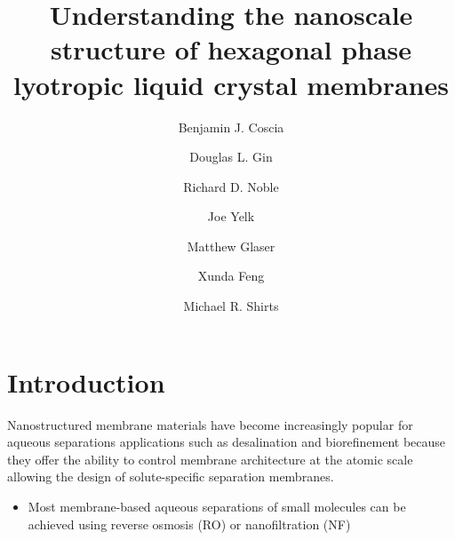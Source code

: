 \documentclass{article}
\title{Understanding the nanoscale structure of hexagonal phase lyotropic liquid crystal membranes}
\author{Benjamin J. Coscia \and Douglas L. Gin \and Richard D. Noble \and Joe Yelk \and Matthew Glaser \and Xunda Feng \and Michael R. Shirts}
\begin{document}
  
  \graphicspath{{./figures/}}
  \maketitle
  \section*{Introduction}
  
  Nanostructured membrane materials have become increasingly popular for 
  aqueous separations applications such as desalination and biorefinement
  because they offer the ability to control membrane architecture at the
  atomic scale allowing the design of solute-specific separation membranes. \cite{humplik_nanostructured_2011}
  \begin{itemize}
    \item Most membrane-based aqueous separations of small molecules can 
    be achieved using reverse osmosis (RO) or nanofiltration (NF) \cite{van_der_bruggen_review_2003}
  \end{itemize}
  
\end{document}
